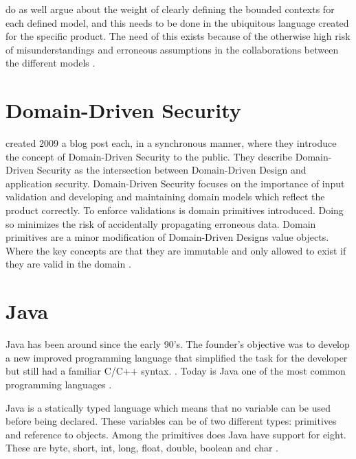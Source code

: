 \textcite{evans_2015} do as well argue about the weight of clearly defining the bounded contexts for each defined model, and this needs to be done in the ubiquitous language created for the specific product. The need of this exists because of the otherwise high risk of misunderstandings and erroneous assumptions in the collaborations between the different models \parencite{millett_2015}.



\section{Domain-Driven Security}
\label{DomainDrivenSecurity}
\textcite{Wilander2009, Johnsson2009} created 2009 a blog post each, in a synchronous manner, where they introduce the concept of Domain-Driven Security to the public. They describe Domain-Driven Security as the intersection between Domain-Driven Design and application security. Domain-Driven Security focuses on the importance of input validation and developing and maintaining domain models which reflect the product correctly. To enforce validations is domain primitives introduced. Doing so minimizes the risk of accidentally propagating erroneous data. Domain primitives are a minor modification of Domain-Driven Designs value objects. Where the key concepts are that they are immutable and only allowed to exist if they are valid in the domain \parencite{Wilander2009, Johnsson2009, Arnor2016, Stendahl2016}.



\section{Java}
\label{JavaInstrumentation}
Java has been around since the early 90's. The founder's objective was to develop a new improved programming language that simplified the task for the developer but still had a familiar C/C++ syntax. \parencite{OracleVoice}. Today is Java one of the most common programming languages \parencite{octoverse}.

Java is a statically typed language which means that no variable can be used before being declared. These variables can be of two different types: primitives and reference to objects. Among the primitives does Java have support for eight. These are byte, short, int, long, float, double, boolean and char \parencite{primjav}.



